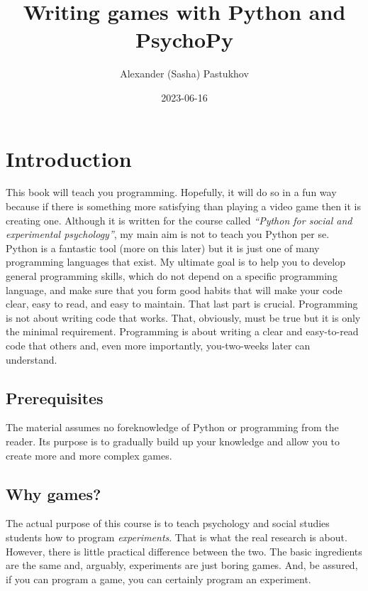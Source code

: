\documentclass[
]{book}
\title{Writing games with Python and PsychoPy}
\author{Alexander (Sasha) Pastukhov}
\date{2023-06-16}
\begin{document}
\maketitle

{
\setcounter{tocdepth}{1}
\tableofcontents
}
\hypertarget{intro}{%
\chapter{Introduction}\label{intro}}

This book will teach you programming. Hopefully, it will do so in a fun way because if there is something more satisfying than playing a video game then it is creating one. Although it is written for the course called \emph{``Python for social and experimental psychology''}, my main aim is not to teach you Python per se. Python is a fantastic tool (more on this later) but it is just one of many programming languages that exist. My ultimate goal is to help you to develop general programming skills, which do not depend on a specific programming language, and make sure that you form good habits that will make your code clear, easy to read, and easy to maintain. That last part is crucial. Programming is not about writing code that works. That, obviously, must be true but it is only the minimal requirement. Programming is about writing a clear and easy-to-read code that others and, even more importantly, you-two-weeks later can understand.

\hypertarget{prerequisites}{%
\section{Prerequisites}\label{prerequisites}}

The material assumes no foreknowledge of Python or programming from the reader. Its purpose is to gradually build up your knowledge and allow you to create more and more complex games.

\hypertarget{why-games}{%
\section{Why games?}\label{why-games}}

The actual purpose of this course is to teach psychology and social studies students how to program \emph{experiments}. That is what the real research is about. However, there is little practical difference between the two. The basic ingredients are the same and, arguably, experiments are just boring games. And, be assured, if you can program a game, you can certainly program an experiment.
\end{document}
